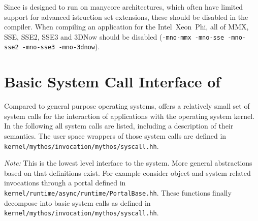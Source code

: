 Since \mythos is designed to run on manycore architectures, which often have
limited support for advanced istruction set extensions, these should be disabled
in the compiler. When compiling an application for the
Intel\textcopyright~Xeon~Phi\texttrademark{}, all of MMX, SSE, SSE2, SSE3 and
3DNow should be disabled (\texttt{-mno-mmx -mno-sse -mno-sse2 -mno-sse3
-mno-3dnow}).

\section{Basic System Call Interface of \mythos}

Compared to general purpose operating systems, \mythos offers a relatively
small set of system calls for the interaction of applications with the
operating system kernel. In the following all system calls are listed,
including a description of their semantics. The user space wrappers of those
system calls are defined in \texttt{kernel/mythos/invocation/mythos/syscall.hh}.

\noindent \emph{Note:} This is the lowest level interface to the system. More
general abstractions based on that definitions exist. For example consider
object and system related invocations through a portal defined in
\texttt{kernel/runtime/async/runtime/PortalBase.hh}. These functions finally
decompose into basic system calls as defined in
\texttt{\\kernel/mythos/invocation/mythos/syscall.hh}.

